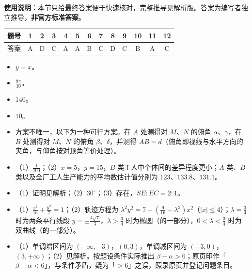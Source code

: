 
\begin{gknotice}
\textbf{使用说明}：本节只给最终答案便于快速核对，完整推导见解析版。答案为编写者独立推导，\textbf{非官方标准答案}。
\end{gknotice}

\begin{center}\begin{tabular}{ccccccccccccc}
\toprule
题号 & 1 & 2 & 3 & 4 & 5 & 6 & 7 & 8 & 9 & 10 & 11 & 12 \\
\midrule
答案 & A & D & C & A & A & B & C & D & C & B & A & C \\
\bottomrule
\end{tabular}\end{center}

\begin{itemize}[leftmargin=2.6em]
  \item[\textbf{13.}] $y=x$。
  \item[\textbf{14.}] $\frac{9\pi}{10}$。
  \item[\textbf{15.}] $140$。
  \item[\textbf{16.}] $10$。
\end{itemize}

\begin{itemize}[leftmargin=2.6em]
  \item[\textbf{17.}] 方案不唯一，以下为一种可行方案。在 $A$ 处测得对 $M$、$N$ 的俯角 $\alpha$、$\gamma$，在 $B$ 处测得对 $M$、$N$ 的俯角 $\beta$、$\delta$，并测得 $AB=d$（俯角即视线与水平方向的夹角，与仰角按对顶角等价处理）。
  \item[\textbf{18.}] （1）$\frac1{100}$；（2）$x=5$，$y=15$，$B$ 类工人中个体间的差异程度更小；$A$ 类、$B$ 类以及全厂工人生产能力的平均数估计值分别为 $123$、$133.8$、$131.1$。
  \item[\textbf{19.}] （1）证明见解析；（2）$30^\circ$；（3）存在，$SE:EC=2:1$。
  \item[\textbf{20.}] （1）$\frac{x^2}{16}+\frac{y^2}{7}=1$；（2）轨迹方程为 $\lambda^2y^2=7+\left(\frac9{16}-\lambda^2\right)x^2$（$|x|\leqslant4$）；$\lambda=\frac34$ 时为两条平行线段 $y=\pm\frac{4\sqrt7}{3}$，$\lambda>\frac34$ 时为椭圆（的一部分），$0<\lambda<\frac34$ 时为双曲线（的一部分）。
  \item[\textbf{21.}] （1）单调增区间为 $(-\infty,-3)$，$(0,3)$，单调减区间为 $(-3,0)$，$(3,+\infty)$；（2）见解析。按题设条件实际推出 $\beta-\alpha>6$；原页印作「$\beta-\alpha<6$」，与条件矛盾，疑为「$>6$」之误，照录原页并登记问题条目。
\end{itemize}

